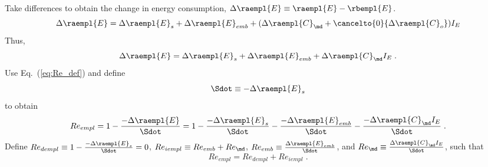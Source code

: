 \begin{landscape}
{Take differences to obtain the change in energy consumption, $\Delta \raempl{E} \equiv \raempl{E} - \rbempl{E}$.
%
\begin{equation}
  \Delta \raempl{E} = \Delta \raempl{E}_s
                      + \Delta \raempl{E}_{emb}
                      + (\Delta \raempl{C}_{\md}
                      + \cancelto{0}{\Delta \raempl{C}_o}) I_E
\end{equation}
%
Thus, 
%
\begin{equation}
\Delta \raempl{E} = \Delta \raempl{E}_s + \Delta \raempl{E}_{emb} + \Delta \raempl{C}_{\md} I_E \; .
\end{equation}
%
Use Eq.~(\ref{eq:Re_def}) and define
%
\begin{equation} \label{eq:Sdot_def}
\Sdot \equiv -\Delta \raempl{E}_s
\end{equation}
%
to obtain
%
\begin{equation}
Re_{empl} = 1 - \frac{-\Delta \raempl{E}}{\Sdot} 
          = 1 - \frac{-\Delta \raempl{E}_s}{\Sdot} 
              - \frac{-\Delta \raempl{E}_{emb}}{\Sdot}
              - \frac{-\Delta \raempl{C}_{\md} I_E}{\Sdot} \; .
\end{equation}
%
Define $Re_{dempl} \equiv 1 - \frac{-\Delta \raempl{E}_s}{\Sdot} = 0$, 
$Re_{iempl} \equiv Re_{emb} + Re_{\md}$, 
$Re_{emb} \equiv \frac{\Delta \raempl{E}_{emb}}{\Sdot}$, and
$Re_{\md} \equiv \frac{\Delta \raempl{C}_{\md} I_E}{\Sdot}$, 
such that
%
\begin{equation} \label{eq:Re_empl_def}
Re_{empl} = Re_{dempl} + Re_{iempl} \; .
\end{equation}
}
{
~
    
}
\end{landscape}
